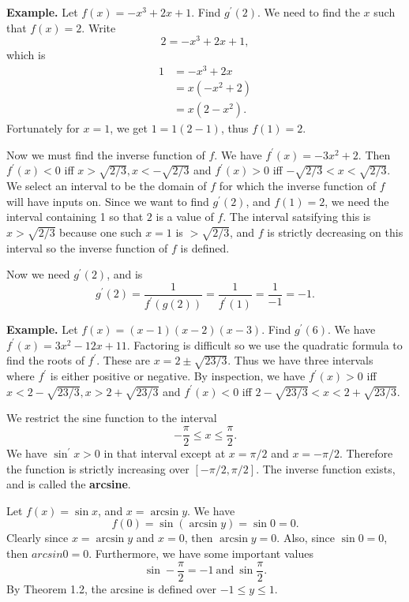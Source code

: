       \textbf{Example.} Let $f(x) = -x^3 + 2x + 1$. Find $g^\prime(2)$. We need to find the $x$ such that $f(x) = 2$. Write
      \[2 = -x^3 + 2x + 1,\]
      which is
      \begin{align*}
        1 &= -x^3 + 2x\\
        &= x(-x^2 + 2)\\
        &= x(2 - x^2).
      \end{align*}
      Fortunately for $x = 1$, we get $1 = 1(2 - 1)$, thus $f(1) = 2$.
      
      Now we must find the inverse function of $f$. We have $f^\prime(x) = -3x^2 + 2$. Then $f^\prime(x) < 0$ iff $x > \sqrt{2/3}, x < -\sqrt{2/3}$ and $f^\prime(x) > 0$ iff $-\sqrt{2/3} < x < \sqrt{2/3}$. We select an interval to be the domain of $f$ for which the inverse function of $f$ will have inputs on. Since we want to find $g^\prime(2)$, and $f(1) = 2$, we need the interval containing 1 so that $2$ is a value of $f$. The interval satsifying this is $x > \sqrt{2/3}$ because one such $x = 1$ is $> \sqrt{2/3}$, and $f$ is strictly decreasing on this interval so the inverse function of $f$ is defined.
      
      Now we need $g^\prime(2)$, and is
      \[g^\prime(2) = \frac{1}{f^\prime(g(2))} = \frac{1}{f^\prime(1)} = \frac{1}{-1} = -1.\]
      
      \textbf{Example.} Let $f(x) = (x-1)(x-2)(x-3)$. Find $g^\prime(6)$. We have $f^\prime(x) = 3x^2 - 12x + 11$. Factoring is difficult so we use the quadratic formula to find the roots of $f^\prime$. These are $x = 2 \pm \sqrt{23/3}$. Thus we have three intervals where $f^\prime$ is either positive or negative. By inspection, we have $f^\prime(x) > 0$ iff $x < 2 - \sqrt{23/3}, x > 2 + \sqrt{23/3}$ and $f^\prime(x) < 0$ iff $2 - \sqrt{23/3} < x < 2 + \sqrt{23/3}$.

      We restrict the sine function to the interval
      \[-\frac{\pi}{2} \le x \le \frac{\pi}{2}.\]
      We have $\sin^\prime x > 0$ in that interval except at $x = \pi/2$ and $x = -\pi/2$. Therefore the function is strictly increasing over $[-\pi/2, \pi/2]$. The inverse function exists, and is called the \textbf{arcsine}.

      Let $f(x) = \sin x$, and $x = \arcsin y$. We have
      \[f(0) = \sin(\arcsin y) = \sin 0 = 0.\]
      Clearly since $x = \arcsin y$ and $x = 0$, then $\arcsin y = 0$. Also, since $\sin 0 = 0$, then $arcsin 0 = 0$. Furthermore, we have some important values
      \[\sin -\frac{\pi}{2} = -1\: \text{and}\: \sin \frac{\pi}{2}.\]
      By Theorem 1.2, the arcsine is defined over $-1 \le y \le 1$.

